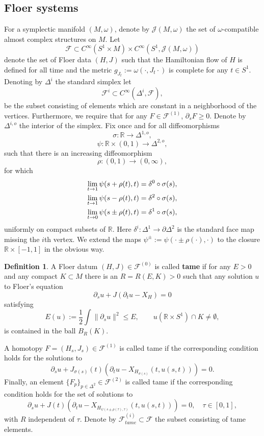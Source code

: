 \documentclass[11pt]{amsart}
\newcommand{\R}{\mathbb{R}}
\theoremstyle{definition}
\newtheorem{df}[tm]{Definition}
\theoremstyle{remark}
\begin{document}
\subsection{Floer systems}
For a symplectic manifold $(M,\omega)$, denote by $\mathcal{J}(M,\omega)$ the set of $\omega$-compatible almost complex structures on $M$. Let
\[
    \mathcal{F} \subset C^{\infty}(S^1\times M)\times C^{\infty}(S^1,\mathcal{J}(M,\omega))
\]
denote the set of Floer data $(H,J)$ such that the  Hamiltonian flow of $H$ is defined for all time and the metric $g_{J_t}:=\omega(\cdot,J_t\cdot)$ is complete for any $t\in S^1$. Denoting by $\Delta^i$ the standard simplex let
\[
\mathcal{F}^{i}\subset C^{\infty}(\Delta^i,\mathcal{F}),
\]
be the subset consisting of elements which are constant in a neighborhood of the vertices.  Furthermore, we require that for any $F\in\mathcal{F}^{(1)}$, $\partial_sF\geq 0$. Denote by $\Delta^{i,o}$ the interior of the simplex. Fix once and for all diffeomorphisms
\[
\sigma:\R\to \Delta^{1,o},
\]
\[
\psi:\R\times(0,1)\to\Delta^{2,o} ,
\]
such that there is an increasing diffeomorphism
\[
\rho:(0,1)\to(0,\infty),
\]
for which
\begin{align}
\lim_{t\to 1}\psi(s+\rho(t),t) &=\delta^0\circ\sigma(s),\notag\\
\lim_{t\to 1}\psi(s-\rho(t),t)&=\delta^2\circ\sigma(s),\notag\\
\lim_{t\to 0}\psi(s\pm\rho(t),t)&=\delta^1\circ\sigma(s),\notag
\end{align}
uniformly on compact subsets of $\R$. Here $\delta^i:\Delta^1\to\partial\Delta^2$ is the standard face map missing the $i$th vertex. We extend the maps $\psi^{\pm}:=\psi(\cdot\pm\rho(\cdot),\cdot)$ to the closure $\R\times[-1,1]$ in the obvious way.
\begin{df}
A Floer datum $(H,J)\in\mathcal{F}^{(0)}$ is called \textbf{tame} if for any $E>0$ and any compact $K\subset M$ there is an $R=R(E,K)>0$ such that any solution $u$ to Floer's equation
\[
\partial_su+J(\partial_tu-X_{H})=0
\]
satisfying
\[
E(u):= \frac1{2}\int\|\partial_su\|^2\leq E,\qquad u(\R\times S^1)\cap K\neq\emptyset,
\]
is contained in the ball $B_R(K).$

A homotopy $F=(H_s,J_s)\in\mathcal{F}^{(1)}$ is called tame if the corresponding condition holds for the solutions to
\[
\partial_su+J_{\sigma(s)}(t)\left(\partial_tu-X_{H_{\sigma(s)}}(t,u(s,t))\right)=0.
\]
Finally, an element $\{F_p\}_{p\in\Delta^2}\in\mathcal{F}^{(2)}$ is called tame if the corresponding condition holds for the set of solutions  to
\[
\partial_su+J(t)\left(\partial_tu-X_{H_{\psi(s\pm\rho(\tau),\tau)}}(t,u(s,t))\right)=0,\quad\tau\in[0,1],
\]
with $R$ independent of $\tau$.  Denote by $\mathcal{F}^{(i)}_{tame}\subset\mathcal{F}$ the subset consisting of tame elements.

 \end{df}
\end{document}
